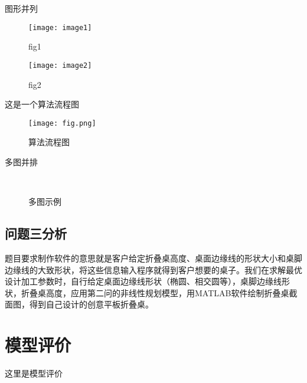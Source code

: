 \documentclass[bwprint,fontset=windows]{gmcmthesis}
\begin{document}
图形并列
\begin{figure}[htp!]
\begin{minipage}[t]{0.48\linewidth}
\centering
\texttt{[image: image1]}
\caption{fig1}
\label{fig:side:a}
\end{minipage}%
\begin{minipage}[t]{0.48\linewidth}
\centering
\texttt{[image: image2]}  %
\caption{fig2}
\label{fig:side:b}
\end{minipage}
\end{figure}


\clearpage
这是一个算法流程图
\begin{figure}[htp!]
\centering
\texttt{[image: fig.png]}
\caption{算法流程图}
\end{figure}

多图并排
\begin{figure}[!htp]
	\centering
	\qquad
	 \\
	\qquad
	\caption{多图示例}
\end{figure}


\subsection{问题三分析}


题目要求制作软件的意思就是客户给定折叠桌高度、桌面边缘线的形状大小和桌脚边缘线的大致形状，将这些信息输入程序就得到客户想要的桌子。我们在求解最优设计加工参数时，自行给定桌面边缘线形状（椭圆、相交圆等），桌脚边缘线形状，折叠桌高度，应用第二问的非线性规划模型，用MATLAB软件绘制折叠桌截面图，得到自己设计的创意平板折叠桌。


\section{模型评价}

这里是模型评价




\cite{mittelbach_latex_2004,wright_latex3_2009,beeton_unicode_2008,vieth_experiences_2009}
\end{document}
